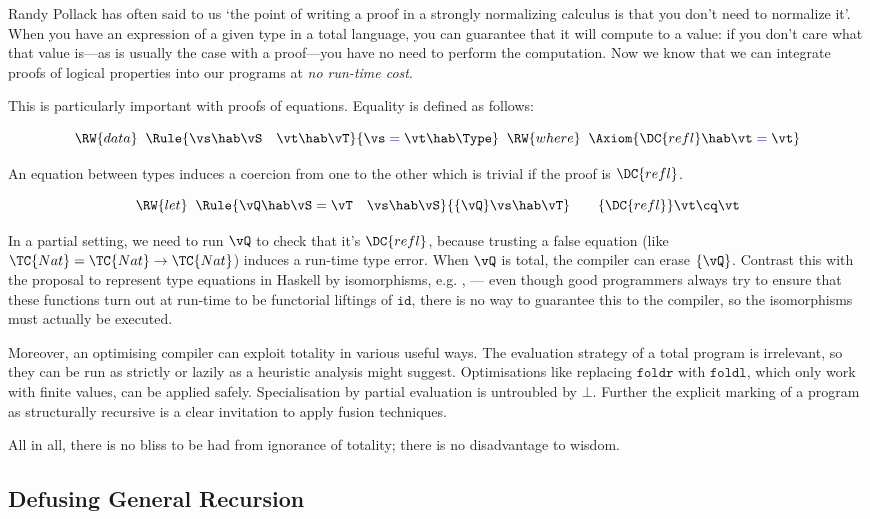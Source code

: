 \documentclass{fundam}
\begin{document}
Randy Pollack has often said to us `the point of writing a proof in a
strongly normalizing calculus is that you don't need to normalize it'.
When you have an expression of a given type in a total language, you
can guarantee that it will compute to a value: if you don't care what
that value is---as is usually the case with a proof---you have no need
to perform the computation. Now we know that we can integrate proofs
of logical properties into our programs at \emph{no run-time cost}.

This is particularly important with proofs of equations. Equality is
defined as follows:

\newcommand{\EQ}{\;\blue{=}\;}
\[
\RW{data}\;\;
\Rule{\vs\hab\vS\quad\vt\hab\vT}
     {\vs\EQ\vt\hab\Type}
\;\;\RW{where}\;\;
\Axiom{\DC{refl}\hab\vt\EQ\vt}
\]

An equation between types induces a coercion from one
to the other which is trivial if the proof is $\DC{refl}$.

\[
\RW{let}\;\;
\Rule{\vQ\hab\vS=\vT\quad \vs\hab\vS}
     {\{\vQ\}\vs\hab\vT}
\qquad
\{\DC{refl}\}\vt \cq\vt
\]

In a partial setting, we need to run $\vQ$ to check that it's
$\DC{refl}$, because trusting a false equation (like
$\TC{Nat}=\TC{Nat}\to\TC{Nat}$) induces a run-time type error.  When
$\vQ$ is total, the compiler can erase
$\{\vQ\}$. 
Contrast this with the proposal to represent type equations 
in Haskell by isomorphisms, e.g. \cite{BaSw02},  --- even though good programmers
always try to ensure that these functions turn out at run-time to be
functorial liftings of $\texttt{id}$, there is no way to guarantee
this to the compiler, so the isomorphisms must actually be executed.

Moreover, an optimising compiler can exploit totality in various
useful ways. The evaluation strategy of a total program is irrelevant,
so they can be run as strictly or lazily as a heuristic analysis might
suggest. Optimisations like replacing $\texttt{foldr}$ with $\texttt{foldl}$,
which only work with finite values, can be applied safely. Specialisation
by partial evaluation is untroubled by $\bot$. Further the explicit marking
of a program as structurally recursive is a clear invitation to apply
fusion techniques.

All in all, there is no bliss to be had from ignorance of totality;
there is no disadvantage to wisdom.


\subsection{Defusing General Recursion}
\end{document}
